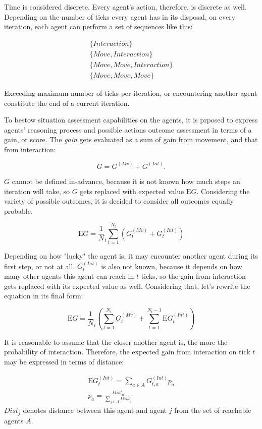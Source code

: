 Time is considered discrete. Every agent's action, therefore, is discrete as well. Depending on the number of ticks
every agent has in its disposal, on every iteration, each agent can perform a set of sequences like this:

$$
    \begin{gathered}
        \{Interaction\}\\
        \{Move, Interaction\}\\
        \{Move, Move, Interaction\}\\
        \{Move, Move, Move\}
    \end{gathered}
$$

Exceeding maximum number of ticks per iteration, or encountering another agent constitute the end of a current iteration.

To bestow situation assessment capabilities on the agents, it is prposed to express agents' reasoning process and
possible actions outcome assessment in terms of a gain, or score. The \textit{gain} gets evaluated as a sum of gain from
movement, and that from interaction:

$$
G = G^{(Mv)} + G^{(Int)}.
$$

$G$ cannot be defined in-advance, because it is not known how much steps an iteration will take, so $G$ gets replaced
with expected value $\mathrm{E}G$. Considering the variety of possible outcomes, it is decided to consider all outcomes
equally probable.

$$
    \mathrm{E}G = \frac 1 N_t \sum_{t=1}^{N_t}{(G^{(Mv)}_t + G^{(Int)}_t)}
$$

Depending on how "lucky" the agent is, it may encounter another agent during its first step, or not at all.
$G^{(Int)}_t$ is also not known, because it depends on how many other agents this agent can reach in $t$ ticks, so the
gain from interaction gets replaced with its expected value as well. Considering that, let's rewrite the equation in its
final form:

\begin{equation}
    \mathrm{E}{G} = \frac 1 N_t (\sum_{t=1}^{N_t}{G^{(Mv)}_t} + \sum_{t=1}^{N_t - 1}{\mathrm{E}G^{(Int)}_t})
\end{equation}

It is reasonable to assume that the closer another agent is, the more the probability of interaction. Therefore, the
expected gain from interaction on tick $t$ may be expressed in terms of distance:

\begin{equation}
    \begin{gathered}
        \mathrm{E}G^{(Int)}_t = \sum_{a \in A}{G^{(Int)}_{t,a}p_{a}}\\
        p_{a} = \frac {Dist_a} {\sum_{j \in A}{Dist_j}}
    \end{gathered}
\end{equation}
$Dist_j$ denotes distance between this agent and agent $j$ from the set of reachable agents $A$.
